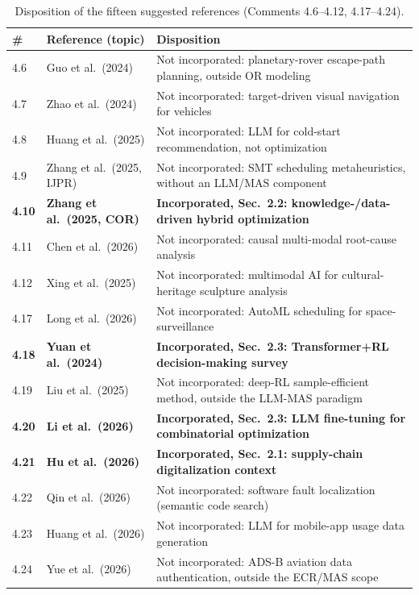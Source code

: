 \documentclass[11pt,a4paper]{article}
\begin{document}
\begin{table}[!ht]
\centering
\footnotesize
\setlength{\tabcolsep}{4pt}
\renewcommand{\arraystretch}{1.05}
\caption{Disposition of the fifteen suggested references (Comments 4.6--4.12, 4.17--4.24).}\label{tab:ref_disposition}
\begin{tabular}{llp{7.8cm}}
\toprule
\# & Reference (topic) & Disposition \\
\midrule
4.6  & Guo et al.\ (2024) & Not incorporated: planetary-rover escape-path planning, outside OR modeling \\
4.7  & Zhao et al.\ (2024) & Not incorporated: target-driven visual navigation for vehicles \\
4.8  & Huang et al.\ (2025) & Not incorporated: LLM for cold-start recommendation, not optimization \\
4.9  & Zhang et al.\ (2025, IJPR) & Not incorporated: SMT scheduling metaheuristics, without an LLM/MAS component \\
\textbf{4.10} & \textbf{Zhang et al.\ (2025, COR)} & \textbf{Incorporated, Sec.~2.2: knowledge-/data-driven hybrid optimization} \\
4.11 & Chen et al.\ (2026) & Not incorporated: causal multi-modal root-cause analysis \\
4.12 & Xing et al.\ (2025) & Not incorporated: multimodal AI for cultural-heritage sculpture analysis \\
4.17 & Long et al.\ (2026) & Not incorporated: AutoML scheduling for space-surveillance \\
\textbf{4.18} & \textbf{Yuan et al.\ (2024)} & \textbf{Incorporated, Sec.~2.3: Transformer+RL decision-making survey} \\
4.19 & Liu et al.\ (2025) & Not incorporated: deep-RL sample-efficient method, outside the LLM-MAS paradigm \\
\textbf{4.20} & \textbf{Li et al.\ (2026)} & \textbf{Incorporated, Sec.~2.3: LLM fine-tuning for combinatorial optimization} \\
\textbf{4.21} & \textbf{Hu et al.\ (2026)} & \textbf{Incorporated, Sec.~2.1: supply-chain digitalization context} \\
4.22 & Qin et al.\ (2026) & Not incorporated: software fault localization (semantic code search) \\
4.23 & Huang et al.\ (2026) & Not incorporated: LLM for mobile-app usage data generation \\
4.24 & Yue et al.\ (2026) & Not incorporated: ADS-B aviation data authentication, outside the ECR/MAS scope \\
\bottomrule
\end{tabular}
\end{table}
\end{document}
